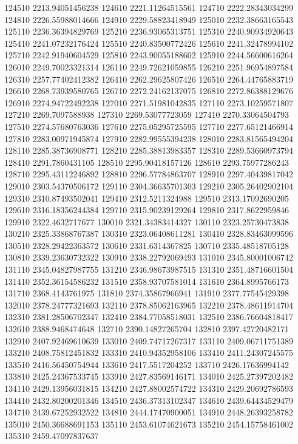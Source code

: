 {124510 2213.94051456238
124610 2221.11264515561
124710 2222.28343034299
124810 2226.55988014666
124910 2229.58823418949
125010 2232.38663165543
125110 2236.36394829769
125210 2236.93065313751
125310 2240.90934920643
125410 2241.07232176424
125510 2240.83500772426
125610 2241.32478994102
125710 2242.91940604529
125810 2243.90055188602
125910 2244.56600616264
126010 2249.70023321314
126110 2249.72621059855
126210 2251.96954897584
126310 2257.77402412382
126410 2262.29625807426
126510 2264.44765883719
126610 2268.73939580765
126710 2272.24162137075
126810 2272.86388129676
126910 2274.94722492238
127010 2271.51981042835
127110 2273.10259571807
127210 2269.7097588938
127310 2269.53077723059
127410 2270.33064504793
127510 2274.57680763036
127610 2275.05295725595
127710 2277.65121466914
127810 2283.00971945874
127910 2282.99555394238
128010 2283.81565494204
128110 2285.38736908771
128210 2285.38813983357
128310 2289.53660973794
128410 2291.7860431105
128510 2295.90418157126
128610 2293.75977286243
128710 2295.43112246892
128810 2296.57784863707
128910 2297.40439817042
129010 2303.54370506172
129110 2304.36635701303
129210 2305.26402902104
129310 2310.87493502041
129410 2312.5211324988
129510 2313.17092690205
129610 2316.18356244384
129710 2315.90239129264
129810 2317.8622959846
129910 2322.4632717677
130010 2321.34383414327
130110 2323.25730473838
130210 2325.33868767387
130310 2323.06408611281
130410 2328.83463099596
130510 2328.29422363572
130610 2331.6314367825
130710 2335.48518705128
130810 2339.23630732322
130910 2338.22792069493
131010 2345.80001006742
131110 2345.04827987755
131210 2346.98673987515
131310 2351.48716601504
131410 2352.36154586232
131510 2358.93707581014
131610 2364.8995766173
131710 2368.4143761975
131810 2374.35867966941
131910 2377.77545429398
132010 2378.24777321693
132110 2378.85062163965
132210 2378.48611914704
132310 2381.28506702347
132410 2384.77058518031
132510 2386.76604818417
132610 2388.9468474648
132710 2390.14827265704
132810 2397.42720482171
132910 2407.92469610639
133010 2409.74717267317
133110 2409.06711751389
133210 2408.75812451832
133310 2410.94352958106
133410 2411.24307245575
133510 2416.56450754944
133610 2417.5517204252
133710 2426.17636994142
133810 2425.24367533745
133910 2427.83569146171
134010 2425.27397202482
134110 2429.13956031815
134210 2427.88002574722
134310 2429.20692786593
134410 2432.80200201346
134510 2436.37313102347
134610 2439.64434529479
134710 2439.67252932522
134810 2444.17470900051
134910 2448.26393258782
135010 2450.36688691153
135110 2453.61074621673
135210 2454.15758461002
135310 2459.47097837637
}
